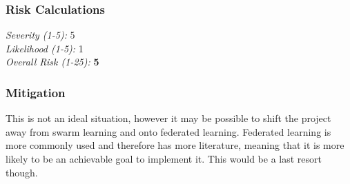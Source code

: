 \subsubsection{Risk Calculations}
\emph{Severity (1-5):} 5 \\
\emph{Likelihood (1-5):} 1 \\
\emph{Overall Risk (1-25):} \textbf{5}

\subsubsection{Mitigation}
This is not an ideal situation, however it may be possible to shift the project away from swarm learning and onto federated learning. Federated learning is more commonly used and therefore has more literature, meaning that it is more likely to be an achievable goal to implement it. This would be a last resort though.